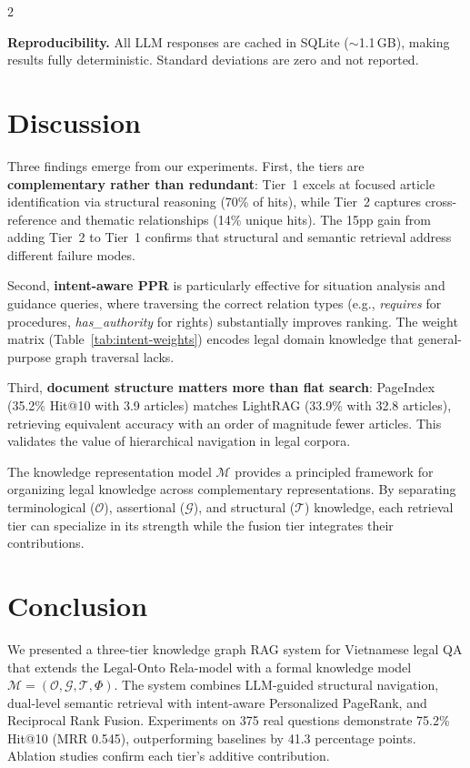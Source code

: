 \documentclass[11pt,a4paper]{article}
\begin{document}
\begin{multicols}{2}

\textbf{Reproducibility.} All LLM responses are cached in SQLite ($\sim$1.1\,GB), making results fully deterministic. Standard deviations are zero and not reported.

\section{Discussion}
\label{sec:discussion}

Three findings emerge from our experiments. First, the tiers are \textbf{complementary rather than redundant}: Tier~1 excels at focused article identification via structural reasoning (70\% of hits), while Tier~2 captures cross-reference and thematic relationships (14\% unique hits). The 15pp gain from adding Tier~2 to Tier~1 confirms that structural and semantic retrieval address different failure modes.

Second, \textbf{intent-aware PPR} is particularly effective for situation analysis and guidance queries, where traversing the correct relation types (e.g., \textit{requires} for procedures, \textit{has\_authority} for rights) substantially improves ranking. The weight matrix (Table~\ref{tab:intent-weights}) encodes legal domain knowledge that general-purpose graph traversal lacks.

Third, \textbf{document structure matters more than flat search}: PageIndex (35.2\% Hit@10 with 3.9 articles) matches LightRAG (33.9\% with 32.8 articles), retrieving equivalent accuracy with an order of magnitude fewer articles. This validates the value of hierarchical navigation in legal corpora.

The knowledge representation model $\mathcal{M}$ provides a principled framework for organizing legal knowledge across complementary representations. By separating terminological ($\mathcal{O}$), assertional ($\mathcal{G}$), and structural ($\mathcal{T}$) knowledge, each retrieval tier can specialize in its strength while the fusion tier integrates their contributions.

\section{Conclusion}
\label{sec:conclusion}

We presented a three-tier knowledge graph RAG system for Vietnamese legal QA that extends the Legal-Onto Rela-model with a formal knowledge model $\mathcal{M} = (\mathcal{O}, \mathcal{G}, \mathcal{T}, \Phi)$. The system combines LLM-guided structural navigation, dual-level semantic retrieval with intent-aware Personalized PageRank, and Reciprocal Rank Fusion. Experiments on 375 real questions demonstrate 75.2\% Hit@10 (MRR 0.545), outperforming baselines by 41.3 percentage points. Ablation studies confirm each tier's additive contribution.


\end{multicols}
\end{document}
